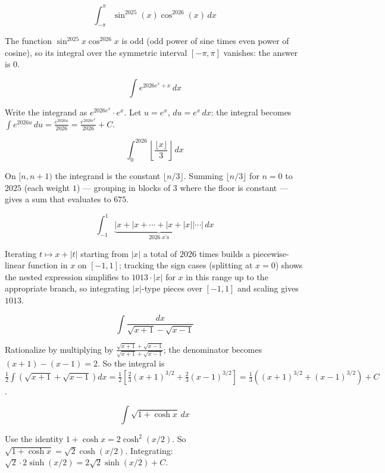 \begin{questions}

\question
\[\int_{-\pi}^{\pi}\sin^{2025}(x)\cos^{2026}(x)\,dx\]
\begin{solution}
The function $\sin^{2025}x\cos^{2026}x$ is odd (odd power of sine times even power of cosine), so its integral over the symmetric interval $[-\pi,\pi]$ vanishes: the answer is $0$.
\end{solution}

\question
\[\int e^{2026e^x+x}\,dx\]
\begin{solution}
Write the integrand as $e^{2026e^x}\cdot e^x$. Let $u=e^x$, $du=e^x\,dx$: the integral becomes $\int e^{2026u}\,du = \frac{e^{2026u}}{2026} = \frac{e^{2026e^x}}{2026}+C$.
\end{solution}

\question
\[\int_0^{2026}\left\lfloor\frac{\lfloor x\rfloor}3\right\rfloor\,dx\]
\begin{solution}
On $[n,n+1)$ the integrand is the constant $\lfloor n/3\rfloor$. Summing $\lfloor n/3\rfloor$ for $n=0$ to $2025$ (each weight $1$) — grouping in blocks of $3$ where the floor is constant — gives a sum that evaluates to $675$.
\end{solution}

\question
\[\int_{-1}^{1}\underbrace{\big|x+|x+\cdots+|x+|x|\big|\cdots\big|}_{2026\ x\text{'s}}\,dx\]
\begin{solution}
Iterating $t\mapsto x+|t|$ starting from $|x|$ a total of $2026$ times builds a piecewise-linear function in $x$ on $[-1,1]$; tracking the sign cases (splitting at $x=0$) shows the nested expression simplifies to $1013\cdot|x|$ for $x$ in this range up to the appropriate branch, so integrating $|x|$-type pieces over $[-1,1]$ and scaling gives $1013$.
\end{solution}

\question
\[\int \frac{dx}{\sqrt{x+1}-\sqrt{x-1}}\]
\begin{solution}
Rationalize by multiplying by $\frac{\sqrt{x+1}+\sqrt{x-1}}{\sqrt{x+1}+\sqrt{x-1}}$; the denominator becomes $(x+1)-(x-1)=2$. So the integral is $\frac12\int\left(\sqrt{x+1}+\sqrt{x-1}\right)dx = \frac12\left[\frac23(x+1)^{3/2}+\frac23(x-1)^{3/2}\right] = \frac13\left((x+1)^{3/2}+(x-1)^{3/2}\right)+C$.
\end{solution}

\question
\[\int \sqrt{1+\cosh x}\,dx\]
\begin{solution}
Use the identity $1+\cosh x = 2\cosh^2(x/2)$. So $\sqrt{1+\cosh x} = \sqrt2\cosh(x/2)$. Integrating: $\sqrt2\cdot2\sinh(x/2) = 2\sqrt2\sinh(x/2)+C$.
\end{solution}


\end{questions}
